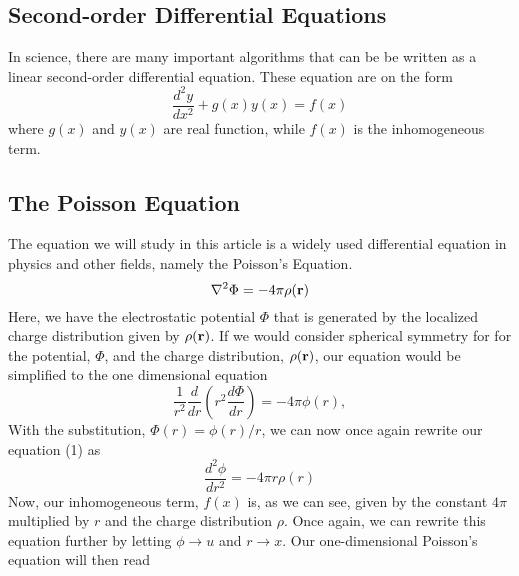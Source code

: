 \documentclass{article}
\begin{document}
\subsection{Second-order Differential Equations}

In science, there are many important algorithms that can be be written as a linear second-order differential equation. These equation are on the form
$$\frac{d^{2}y}{dx^{2}} + g(x)y(x) = f(x)$$
where $g(x)$ and $y(x)$ are real function, while $f(x)$ is the inhomogeneous term.
\newline
\subsection{The Poisson Equation} 

\newline The equation we will study in this article is a widely used differential equation in physics and other fields, namely the Poisson's Equation.
\begin{equation}
    \laplacian \Phi = -4 \pi \rho(\vb{r}) %
\end{equation}
Here, we have the electrostatic potential $\Phi$ that is generated by the localized charge distribution given by $\rho(\vb{r})$.
\newline
If we would consider spherical symmetry for for the potential, $\Phi$, and the charge distribution, $\rho(\vb{r})$, our equation would be simplified to the one dimensional equation
$$
    \frac{1}{r^2}\frac{d}{dr}\left( r^2 \frac{d\Phi}{dr} \right) = -4\pi\phi(r),
$$
With the substitution, $\Phi(r)=\phi(r)/r$, we can now once again rewrite our equation (1) as
$$
    \frac{d^2\phi}{dr^2} = -4\pi r \rho(r)
$$
Now, our inhomogeneous term, $f(x)$ is, as we can see, given by the constant $4\pi$ multiplied by $r$ and the charge distribution $\rho$.
\newline\newline
Once again, we can rewrite this equation further by letting $\phi \rightarrow u$ and $r \rightarrow x$. Our one-dimensional Poisson's equation will then read
\end{document}
